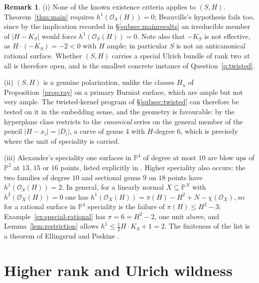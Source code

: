 \documentclass{amsart}
\theoremstyle{definition}
\newtheorem{remark}[theorem]{Remark}
\newcommand{\OO}{\mathcal{O}}
\newcommand{\PP}{\mathbb{P}}
\begin{document}
\begin{remark}\label{rem:special-rational-context}
(i) None of the known existence criteria applies to $(S,H)$. Theorem~\ref{thm:main} requires $h^1(\OO_S(H))=0$; Beauville's hypothesis fails too, since by the implication recorded in \S\ref{subsec:mainresults} an irreducible member of $|H-K_S|$ would force $h^1(\OO_S(H))=0$. Note also that $-K_S$ is not effective, as $H\cdot(-K_S)=-2<0$ with $H$ ample; in particular $S$ is not an anticanonical rational surface. Whether $(S,H)$ carries a special Ulrich bundle of rank two at all is therefore open, and is the smallest concrete instance of Question~\ref{q:twisted}.

(ii) $(S,H)$ is a genuine polarization, unlike the classes $H_u$ of Proposition~\ref{prop:ray} on a primary Burniat surface, which are ample but not very ample. The twisted-kernel program of \S\ref{subsec:twisted} can therefore be tested on it in the embedding sense, and the geometry is favourable: by \cite[Lem.~III.7, Cor.~III.11]{CH97} the hyperplane class restricts to the \emph{canonical} series on the general member of the pencil $|H-x_i|=|D_i|$, a curve of genus $4$ with $H$-degree $6$, which is precisely where the unit of speciality is carried.

(iii) Alexander's speciality one surfaces in $\PP^4$ of degree at most $10$ are blow ups of $\PP^2$ at $13$, $15$ or $16$ points, listed explicitly in \cite[\S IV]{CH97}. Higher speciality also occurs: the two families of degree $10$ and sectional genus $9$ on $18$ points have $h^1(\OO_S(H))=2$. In general, for a linearly normal $X\subseteq\PP^N$ with $h^2(\OO_X(H))=0$ one has $h^1(\OO_X(H))=\pi(H)-H^2+N-\chi(\OO_X)$, so for a rational surface in $\PP^4$ speciality is the failure of $\pi(H)\le H^2-3$; Example~\ref{ex:special-rational} has $\pi=6=H^2-2$, one unit above, and Lemma~\ref{lem:restriction} allows $h^1\le\tfrac12H\cdot K_S+1=2$. The finiteness of the list is a theorem of Ellingsrud and Peskine \cite{EP89}.
\end{remark}

\section{Higher rank and Ulrich wildness}\label{sec:evenrank}
\end{document}
